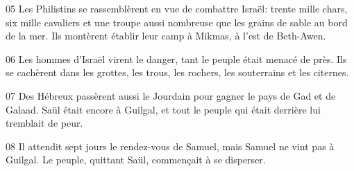 
05 Les Philistins se rassemblèrent en vue de combattre Israël: trente mille chars, six mille cavaliers et une troupe aussi nombreuse que les grains de sable au bord de la mer. Ils montèrent établir leur camp à Mikmas, à l’est de Beth-Awen.

06 Les hommes d’Israël virent le danger, tant le peuple était menacé de près. Ils se cachèrent dans les grottes, les trous, les rochers, les souterrains et les citernes.

07 Des Hébreux passèrent aussi le Jourdain pour gagner le pays de Gad et de Galaad. Saül était encore à Guilgal, et tout le peuple qui était derrière lui tremblait de peur.

08 Il attendit sept jours le rendez-vous de Samuel, mais Samuel ne vint pas à Guilgal. Le peuple, quittant Saül, commençait à se disperser.
